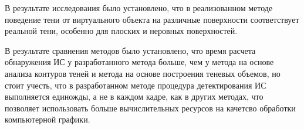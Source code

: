 В результате исследования было установлено, что в реализованном методе поведение тени от виртуального объекта на различные поверхности соответствует реальной тени, особенно для плоских и неровных поверхностей.

В результате сравнения методов было установлено, что время расчета обнаружения ИС у разработанного метода больше, чем у метода на основе анализа контуров теней и метода на основе построения теневых объемов, но стоит учесть, что в разработанном методе процедура детектирования ИС выполняется единожды, а не в каждом кадре, как в других методах, что позволяет использовать больше вычислительных ресурсов на качетсво обработки компьютерной графики.